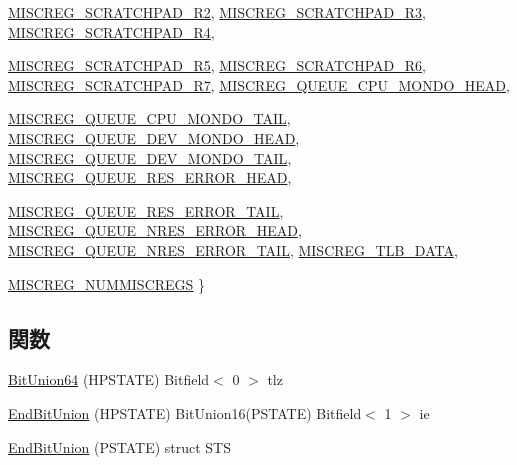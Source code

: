 \begin{DoxyCompactItemize}
\hyperlink{namespaceSparcISA_a1e522017e015d4c7efd6b2360143aa67a5085234ae1d0e3bfb572a240c06673f8}{MISCREG\_\-SCRATCHPAD\_\-R2}, 
\hyperlink{namespaceSparcISA_a1e522017e015d4c7efd6b2360143aa67a91d19fbf3f8dfd0c84b7d6459b7139ad}{MISCREG\_\-SCRATCHPAD\_\-R3}, 
\hyperlink{namespaceSparcISA_a1e522017e015d4c7efd6b2360143aa67a4456c17dffcd586476e0a6e38c822558}{MISCREG\_\-SCRATCHPAD\_\-R4}, 
\par
\hyperlink{namespaceSparcISA_a1e522017e015d4c7efd6b2360143aa67af799584c240f3ef33c20afc075a80c7c}{MISCREG\_\-SCRATCHPAD\_\-R5}, 
\hyperlink{namespaceSparcISA_a1e522017e015d4c7efd6b2360143aa67a70d6ff96a9996382fe622f5519f5ff75}{MISCREG\_\-SCRATCHPAD\_\-R6}, 
\hyperlink{namespaceSparcISA_a1e522017e015d4c7efd6b2360143aa67a765d3527bb6eae4a34fcaf2907e3d845}{MISCREG\_\-SCRATCHPAD\_\-R7}, 
\hyperlink{namespaceSparcISA_a1e522017e015d4c7efd6b2360143aa67a81ca66cee2aadc5cd33b8138db307849}{MISCREG\_\-QUEUE\_\-CPU\_\-MONDO\_\-HEAD}, 
\par
\hyperlink{namespaceSparcISA_a1e522017e015d4c7efd6b2360143aa67a1f59227222946d03011b7a1d0ecd4d2f}{MISCREG\_\-QUEUE\_\-CPU\_\-MONDO\_\-TAIL}, 
\hyperlink{namespaceSparcISA_a1e522017e015d4c7efd6b2360143aa67a6ffaee8faad748d1c061599eb1c510ee}{MISCREG\_\-QUEUE\_\-DEV\_\-MONDO\_\-HEAD}, 
\hyperlink{namespaceSparcISA_a1e522017e015d4c7efd6b2360143aa67aa4f306ee6aba7151262316d8d203112d}{MISCREG\_\-QUEUE\_\-DEV\_\-MONDO\_\-TAIL}, 
\hyperlink{namespaceSparcISA_a1e522017e015d4c7efd6b2360143aa67aff0d55bc222c2864b5bea1ee52fc9fec}{MISCREG\_\-QUEUE\_\-RES\_\-ERROR\_\-HEAD}, 
\par
\hyperlink{namespaceSparcISA_a1e522017e015d4c7efd6b2360143aa67a224ac155257ddebe65c41e19f5f90acd}{MISCREG\_\-QUEUE\_\-RES\_\-ERROR\_\-TAIL}, 
\hyperlink{namespaceSparcISA_a1e522017e015d4c7efd6b2360143aa67a0d614981712ccfac162204f0b56e927c}{MISCREG\_\-QUEUE\_\-NRES\_\-ERROR\_\-HEAD}, 
\hyperlink{namespaceSparcISA_a1e522017e015d4c7efd6b2360143aa67a007b515a82637761bc98d192103ba4df}{MISCREG\_\-QUEUE\_\-NRES\_\-ERROR\_\-TAIL}, 
\hyperlink{namespaceSparcISA_a1e522017e015d4c7efd6b2360143aa67a34e96fb9ddfda445e0f7f353b647e55f}{MISCREG\_\-TLB\_\-DATA}, 
\par
\hyperlink{namespaceSparcISA_a1e522017e015d4c7efd6b2360143aa67ad347463f724b554c56542add74724d6e}{MISCREG\_\-NUMMISCREGS}
 \}
\end{DoxyCompactItemize}
\subsection*{関数}
\begin{DoxyCompactItemize}
\item 
\hyperlink{namespaceSparcISA_abe81ef90e3604c575f470d6bd37d031b}{BitUnion64} (HPSTATE) Bitfield$<$ 0 $>$ tlz
\item 
\hyperlink{namespaceSparcISA_ac857bae84fbb9872a54fff13d22d6eb0}{EndBitUnion} (HPSTATE) BitUnion16(PSTATE) Bitfield$<$ 1 $>$ ie
\item 
\hyperlink{namespaceSparcISA_a076c40062819aabeb97f74d33ce972a9}{EndBitUnion} (PSTATE) struct STS
\end{DoxyCompactItemize}
